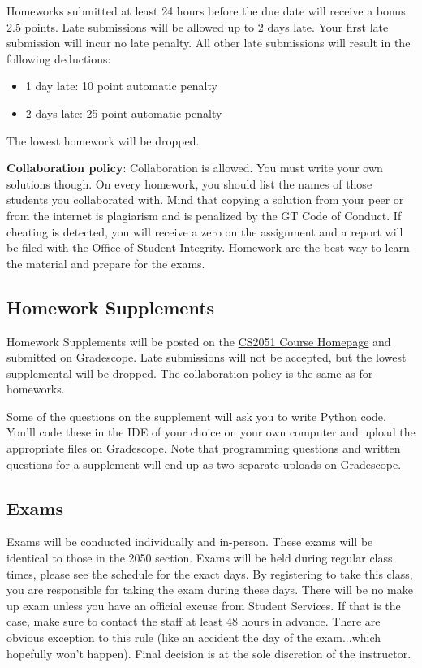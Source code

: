 \documentclass{article}
\begin{document}
    \vspace{3mm}
    Homeworks submitted at least 24 hours before the due date will receive a bonus 2.5 points. Late submissions will be allowed up to 2 days late.  Your first late submission will incur no late penalty. All other late submissions will result in the following deductions: 
    \begin{itemize}
        \item 1 day late: 10 point automatic penalty 
        \item 2 days late: 25 point automatic penalty
    \end{itemize}
    The lowest homework will be dropped.
    
    \vspace{3mm}
    \textbf{Collaboration policy}: Collaboration is allowed. You must write your own solutions though. On every homework, you should list the names of those students you collaborated with. Mind that copying a solution from your peer or from the internet is plagiarism and is penalized by the GT Code of Conduct. If cheating is detected, you will receive a zero on the assignment and a report will be filed with the Office of Student Integrity. Homework are the best way to learn the material and prepare for the exams.

\subsection*{Homework Supplements}
    Homework Supplements will be posted on the \href{https://github.com/sar-mo/CS2051-HonorsDiscreteMath}{CS2051 Course Homepage} and submitted on Gradescope. Late submissions will not be accepted, but the lowest supplemental will be dropped. The collaboration policy is the same as for homeworks.
    
    \vspace{3mm}
    Some of the questions on the supplement will ask you to write Python code. You’ll code these in the IDE of your choice on your own computer and upload the appropriate files on Gradescope. Note that programming questions and written questions for a supplement will end up as two separate uploads on Gradescope.

\subsection*{Exams}
    Exams will be conducted individually and in-person. These exams will be identical to those in the 2050 section. Exams will be held during regular class times, please see the schedule for the exact days. By registering to take this class, you are responsible for taking the exam during these days. There will be no make up exam unless you have an official excuse from Student Services. If that is the case, make sure to contact the staff at least 48 hours in advance. There are obvious exception to this rule (like an accident the day of the exam...which hopefully won’t happen). Final decision is at the sole discretion of the instructor.
\end{document}
